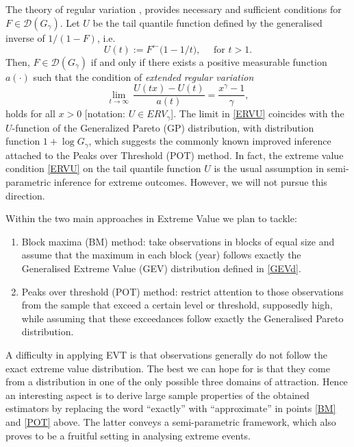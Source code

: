 \documentclass[10pt, a4paper, oneside]{article}
\newcommand{\mc}[1]{{\ensuremath{\mathcal{#1}}}}
\newcommand{\limit}[1]{\ensuremath{\displaystyle {\lim_{#1 \rightarrow{\infty}}}}}
\begin{document}
The theory of regular variation \citep{Binghametal:87,deHaan:70, deHF:06}, provides necessary and sufficient conditions for $F\in \mc{D}(G_{\gamma})$. Let $U$ be the tail quantile function defined by the generalised inverse of $1/(1-F)$, i.e.
\begin{equation*}
U(t):=   F^{\leftarrow} \bigl( 1-1/t\bigr), \quad \mbox{ for } t>1.
\end{equation*}
Then, $F\in \mc{D}(G_{\gamma})$ if and only if there exists a positive  measurable function $a(\cdot)$ such that the condition of \emph{extended regular variation}
\begin{equation}\label{ERVU}
	\limit{t}\,\frac{U(tx)-U(t)}{a(t)}= \frac{x^{\gamma}-1}{\gamma},
\end{equation}
holds for all $x>0$ [notation: $U\in ERV_{\gamma}$].
The limit  in  \eqref{ERVU} coincides with the $U$-function of the Generalized Pareto (GP) distribution, with distribution function $1+\log G_\gamma$, which suggests the commonly known improved inference attached to the Peaks over Threshold (POT) method. In fact, the extreme value condition \eqref{ERVU}  on the tail quantile function $U$ is the usual assumption in semi-parametric inference for extreme outcomes. However, we will not pursue this direction.

Within the two main approaches in Extreme Value  we plan to tackle:
\begin{enumerate}
\item\label{BM} Block maxima (BM) method: take observations in blocks of equal size and assume that the maximum in each block (year) follows exactly the Generalised Extreme Value (GEV) distribution defined in \eqref{GEVd}.
\item\label{POT} Peaks over threshold (POT) method: restrict attention to those observations from the sample that exceed a certain level or threshold, supposedly high, while assuming that these exceedances follow exactly the Generalised Pareto distribution.	
\end{enumerate}

A difficulty in applying EVT is that observations generally do not follow the exact extreme value distribution. The best we can hope for is that they come from a distribution in one of the only possible three domains of attraction. Hence an interesting aspect is to derive large sample properties of the obtained estimators by replacing the word ``exactly'' with ``approximate'' in points \ref{BM} and \ref{POT} above. The latter conveys a semi-parametric framework, which also proves to be a  fruitful setting in analysing extreme events. 
\end{document}
